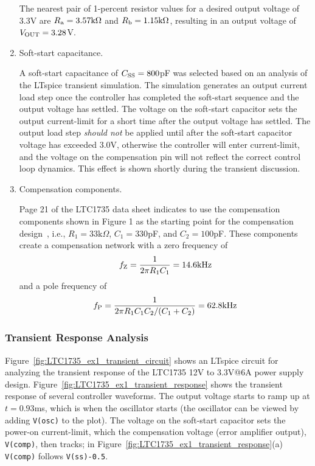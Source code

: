 \begin{enumerate}
The nearest pair of 1-percent resistor values for a desired
output voltage of 3.3V are $R_{\rm a} = 3.57\text{k}\Omega$ and 
$R_{\rm b} = 1.15\text{k}\Omega$, resulting in an output
voltage of $V_{\rm OUT} = 3.28$V.

\item Soft-start capacitance.

A soft-start capacitance of $C_{\rm SS} = 800$pF was selected based
on an analysis of the LTspice transient simulation.
The simulation generates an output current load step once the 
controller has completed the soft-start sequence and the output
voltage has settled. The voltage on the soft-start capacitor 
sets the output current-limit for a short time after the
output voltage has settled. The output load step {\em should not}
be applied until after the soft-start capacitor voltage has exceeded
3.0V, otherwise the controller will enter current-limit, and
the voltage on the compensation pin will not reflect the
correct control loop dynamics.
This effect is shown shortly during the transient discussion.

\item Compensation components.

Page 21 of the LTC1735 data sheet indicates to use the compensation
components shown in Figure 1 as the starting point for the 
compensation design~\cite{Linear_LTC1735_1998}, i.e., 
$R_1  = 33\text{k}\Omega$, $C_1 = 330$pF, and
$C_2 = 100$pF. These components create a compensation
network with a zero frequency of
%
\begin{equation}
f_{\rm Z} = \frac{1}{2\pi R_1 C_1} = 14.6\text{kHz}
\end{equation}
%
and a pole frequency of
%
\begin{equation}
f_{\rm P} = \frac{1}{2\pi R_1 C_1C_2/(C_1+C_2)}
= 62.8\text{kHz}
\end{equation}
\end{enumerate}

\clearpage
\subsubsection{Transient Response Analysis}

Figure~\ref{fig:LTC1735_ex1_transient_circuit} shows an LTspice
circuit for analyzing the transient response of the
LTC1735 12V to 3.3V@6A power supply design.
Figure~\ref{fig:LTC1735_ex1_transient_response} shows the transient
response of several controller waveforms. The output voltage starts
to ramp up at $t = 0.93$ms, which is when the oscillator starts (the 
oscillator can be viewed by adding \verb+V(osc)+ to the plot).
The voltage on the soft-start capacitor sets the power-on 
current-limit, which the compensation voltage (error amplifier 
output), \verb+V(comp)+, then tracks;
in Figure~\ref{fig:LTC1735_ex1_transient_response}(a) \verb+V(comp)+
follows \verb+V(ss)-0.5+.

